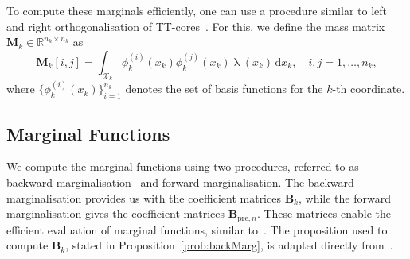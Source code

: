 To compute these marginals efficiently, one can use a procedure similar to left and right orthogonalisation of TT-cores~\cite{oseledets2011tensor}. For this, we define the mass matrix $\bm{M}_k \in \mathbb{R}^{n_k \times n_k}$ as
\begin{equation}
	\bm{M}_k[i, j] = \int_{\mathcal{X}_k} \phi^{(i)}_k(x_k) \phi^{(j)}_k(x_k) \uplambda(x_k) \, \mathrm{d}x_k, \quad i, j = 1, \dots, n_k,
\end{equation}
where $\{\phi^{(i)}_k(x_k)\}_{i=1}^{n_k}$ denotes the set of basis functions for the $k$-th coordinate.



\subsection{Marginal Functions}
We compute the marginal functions using two procedures, referred to as backward marginalisation~\cite{cui2022deep} and forward marginalisation. The backward marginalisation provides us with the coefficient matrices $\bm{B}_k$, while the forward marginalisation gives the coefficient matrices $\bm{B}_{\text{pre}, n}$. These matrices enable the efficient evaluation of marginal functions, similar to~\cite{cui2022deep}.
The proposition used to compute $\bm{B}_k$, stated in Proposition~\ref{prob:backMarg}, is adapted directly from~\cite{cui2022deep}.

